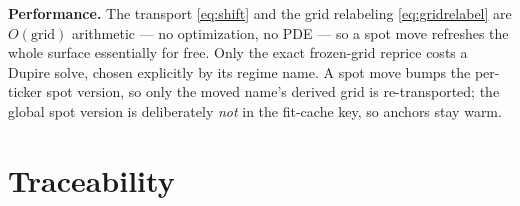 \documentclass[11pt]{article}
\begin{document}
\noindent\textbf{Performance.}  The transport \eqref{eq:shift} and the
grid relabeling \eqref{eq:gridrelabel} are $O(\text{grid})$ arithmetic
--- no optimization, no PDE --- so a spot move refreshes the whole
surface essentially for free.  Only the exact frozen-grid reprice costs
a Dupire solve, chosen explicitly by its regime name.  A spot move
bumps the per-ticker spot version, so only the moved name's derived
grid is re-transported; the global spot version is deliberately
\emph{not} in the fit-cache key, so anchors stay warm.

\section{Traceability}
\label{app:trace}
\end{document}
